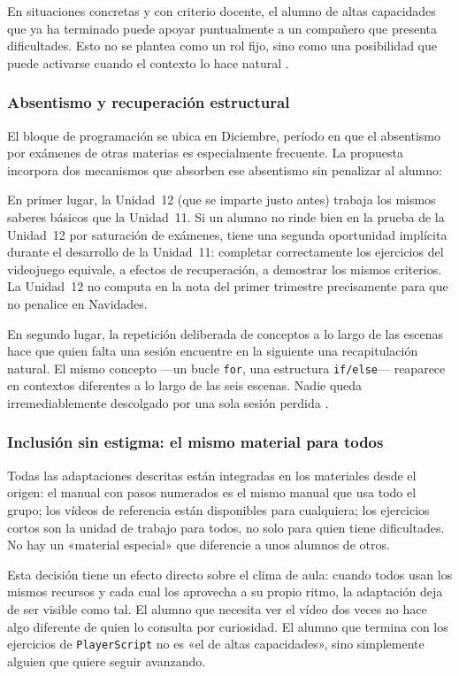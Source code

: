 \documentclass[a4paper,12pt]{article}
\begin{document}
En situaciones concretas y con criterio docente, el alumno de altas capacidades que ya ha terminado puede apoyar puntualmente a un compañero que presenta dificultades. Esto no se plantea como un rol fijo, sino como una posibilidad que puede activarse cuando el contexto lo hace natural \citep{cohen1982tutoring}.


\subsubsection*{Absentismo y recuperación estructural}


El bloque de programación se ubica en Diciembre, período en que el absentismo por exámenes de otras materias es especialmente frecuente. La propuesta incorpora dos mecanismos que absorben ese absentismo sin penalizar al alumno:


En primer lugar, la Unidad~12 (que se imparte justo antes) trabaja los mismos saberes básicos que la Unidad~11. Si un alumno no rinde bien en la prueba de la Unidad~12 por saturación de exámenes, tiene una segunda oportunidad implícita durante el desarrollo de la Unidad~11: completar correctamente los ejercicios del videojuego equivale, a efectos de recuperación, a demostrar los mismos criterios. La Unidad~12 no computa en la nota del primer trimestre precisamente para que no penalice en Navidades.


En segundo lugar, la repetición deliberada de conceptos a lo largo de las escenas hace que quien falta una sesión encuentre en la siguiente una recapitulación natural. El mismo concepto ---un bucle \texttt{for}, una estructura \texttt{if/else}--- reaparece en contextos diferentes a lo largo de las seis escenas. Nadie queda irremediablemente descolgado por una sola sesión perdida \citep{cepeda2006distributed}.


\subsubsection*{Inclusión sin estigma: el mismo material para todos}


Todas las adaptaciones descritas están integradas en los materiales desde el origen: el manual con pasos numerados es el mismo manual que usa todo el grupo; los vídeos de referencia están disponibles para cualquiera; los ejercicios cortos son la unidad de trabajo para todos, no solo para quien tiene dificultades. No hay un «material especial» que diferencie a unos alumnos de otros.


Esta decisión tiene un efecto directo sobre el clima de aula: cuando todos usan los mismos recursos y cada cual los aprovecha a su propio ritmo, la adaptación deja de ser visible como tal. El alumno que necesita ver el vídeo dos veces no hace algo diferente de quien lo consulta por curiosidad. El alumno que termina con los ejercicios de \texttt{PlayerScript} no es «el de altas capacidades», sino simplemente alguien que quiere seguir avanzando.
\end{document}

